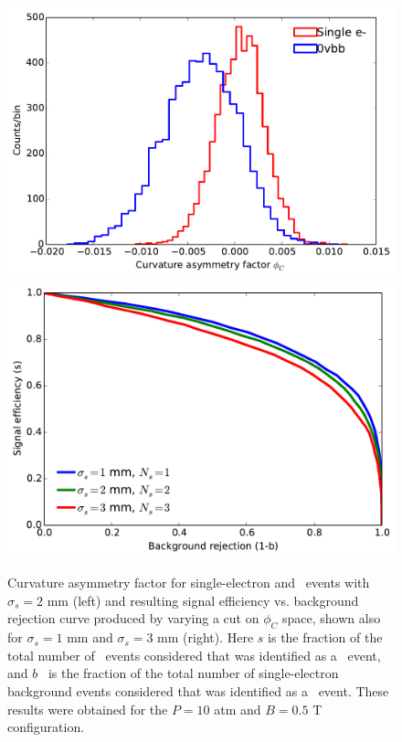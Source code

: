 \documentclass{JINST}
\begin{document}
\begin{figure}[!htb]
	\includegraphics[scale=0.44]{fig/10atm_05T_scurv_diff_means.pdf}
	\includegraphics[scale=0.44]{fig/10atm_05T_sigvsb_all.pdf}
	\caption{\label{fig_svsbg}Curvature asymmetry factor for single-electron and \bbonu\ events with $\sigma_{s} = 2$ mm  (left) and resulting signal efficiency vs. background rejection curve produced by varying a cut on $\phi_{C}$ space, shown also for $\sigma_{s} = 1$ mm and $\sigma_{s} = 3$ mm (right).  Here $s$ is the fraction of the total number of \bbonu\ events considered that was identified as a \bbonu\ event, and $b$~ is the fraction of the total number of single-electron background events considered that was identified as a \bbonu\ event.  These results were obtained for the $P = 10$ atm and $B = 0.5$ T configuration.}
\end{figure}
\end{document}
